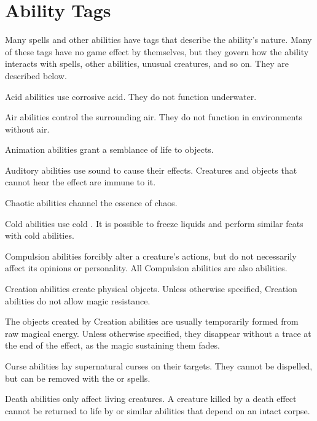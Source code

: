 \section{Ability Tags}\label{Ability Tags}

    Many spells and other abilities have tags that describe the ability's nature. Many of these tags have no game effect by themselves, but they govern how the ability interacts with spells, other abilities, unusual creatures, and so on. They are described below.

     Acid abilities use corrosive acid. They do not function underwater.

     Air abilities control the surrounding air. They do not function in environments without air.

     Animation abilities grant a semblance of life to objects.

     Auditory abilities use sound to cause their effects. Creatures and objects that cannot hear the effect are immune to it.

     Chaotic abilities channel the essence of chaos.

     Cold abilities use cold . It is possible to freeze liquids and perform similar feats with cold abilities.

     Compulsion abilities forcibly alter a creature's actions, but do not necessarily affect its opinions or personality.
    All Compulsion abilities are also  abilities.

     Creation abilities create physical objects. Unless otherwise specified, Creation abilities do not allow magic resistance. 
    \par The objects created by Creation abilities are usually temporarily formed from raw magical energy.
    Unless otherwise specified, they disappear without a trace at the end of the effect, as the magic sustaining them fades.

     Curse abilities lay supernatural curses on their targets. They cannot be dispelled, but can be removed with the  or  spells.

     Death abilities only affect living creatures. A creature killed by a death effect cannot be returned to life by  or similar abilities that depend on an intact corpse.

